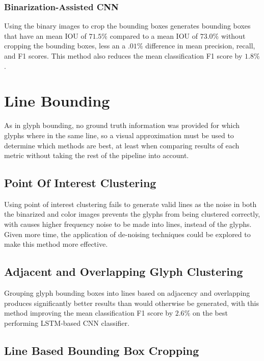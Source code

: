 \subsubsection{Binarization-Assisted CNN}

Using the binary images to crop the bounding boxes generates bounding boxes that have an mean IOU of $71.5\%$ compared to a mean IOU of $73.0\%$ without cropping the bounding boxes, less an a $.01\%$ difference in mean precision, recall, and F1 scores. This method also reduces the mean classification F1 score by $1.8\%$.

\section{Line Bounding}

As in glyph bounding, no ground truth information was provided for which glyphs where in the same line, so a visual approximation must be used to determine which methods are best, at least when comparing results of each metric without taking the rest of the pipeline into account.

\subsection{Point Of Interest Clustering}

Using point of interest clustering fails to generate valid lines as the noise in both the binarized and color images prevents the glyphs from being clustered correctly, with causes higher frequency noise to be made into lines, instead of the glyphs. Given more time, the application of de-noising techniques could be explored to make this method more effective.

\subsection{Adjacent and Overlapping Glyph Clustering}

Grouping glyph bounding boxes into lines based on adjacency and overlapping produces significantly better results than would otherwise be generated, with this method improving the mean classification F1 score by $2.6\%$ on the best performing LSTM-based CNN classifier.

\subsection{Line Based Bounding Box Cropping}

